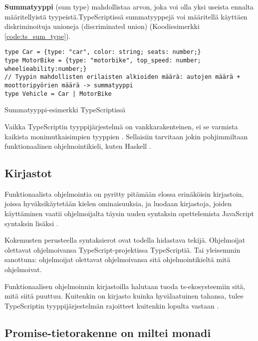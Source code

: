 \textbf{Summatyyppi} (sum type) mahdollistaa arvon, joka voi olla yksi useista ennalta määritellyistä tyypeistä.TypeScriptissä summatyyppejä voi määritellä käyttäen diskriminoituja unioneja (discriminated union) (Koodiesimerkki \ref{code:ts_sum_type}). \citep{algebraic_data_types,holvikari2021category}

\begin{code}
    \begin{verbatim}
type Car = {type: "car", color: string; seats: number;}
type MotorBike = {type: "motorbike", top_speed: number; wheelieability:number;}
// Tyypin mahdollisten erilaisten alkioiden määrä: autojen määrä + moottoripyörien määrä -> summatyyppi
type Vehicle = Car | MotorBike
\end{verbatim}
    \caption{Summatyyppi-esimerkki TypeScriptissä}
    \label{code:ts_sum_type}
\end{code}


Vaikka TypeScriptin tyyppijärjestelmä on vankkarakenteinen, ei se varmista kaikista monimutkaisimpien tyyppien . Sellaisiin tarvitaan jokin pohjimmiltaan funktionaalinen ohjelmointikieli, kuten Haskell \cite{holvikari2021category}.

\subsection{Kirjastot}

Funktionaalista ohjelmointia on pyritty pitämään elossa erinäköisin kirjastoin, joissa hyväksikäytetään kielen ominaisuuksia, ja luodaan kirjastoja, joiden käyttäminen vaatii ohjelmoijalta täysin uuden syntaksin opettelemista JavaScript syntaksin lisäksi \cite{ramda,sanctuary,crocks,fpts}.

Kokemusten perusteella syntaksierot ovat todella hidastava tekijä. Ohjelmoijat olettavat ohjelmoivansa TypeScript-projektissa TypeScriptiä. Tai yleisemmin sanottuna: ohjelmoijat olettavat ohjelmoivansa sitä ohjelmointikieltä mitä ohjelmoivat.

Funktionaalisen ohjelmoinnin kirjastoilla halutaan tuoda \gls{ts}-ekosysteemiin sitä, mitä siitä puuttuu. Kuitenkin on kirjasto kuinka hyvälaatuinen tahansa, tulee TypeScriptin tyyppijärjestelmän rajoitteet kuitenkin lopulta vastaan \cite{holvikari2021category}.



\subsection{Promise-tietorakenne on miltei monadi}

